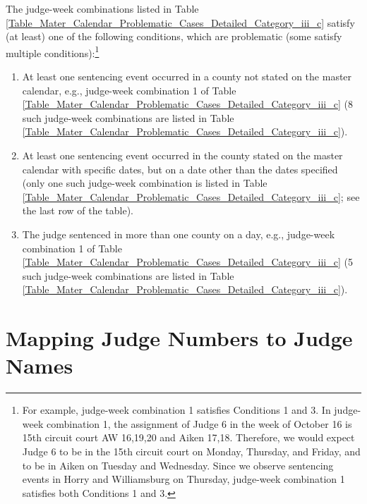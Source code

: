 \documentclass[11pt, oneside]{article}   	%
\theoremstyle{ModifiedStyle}
\begin{document}
			The judge-week combinations listed in Table \ref{Table_Mater_Calendar_Problematic_Cases_Detailed_Category_iii_c} satisfy (at least) one of the following conditions, which are problematic (some satisfy multiple conditions):\footnote{For example, judge-week combination 1 satisfies Conditions 1 and 3. In judge-week combination 1, the assignment of Judge 6 in the week of October 16 is 15th circuit court AW 16,19,20 and Aiken 17,18. Therefore, we would expect Judge 6 to be in the 15th circuit court on Monday, Thursday, and Friday, and to be in Aiken on Tuesday and Wednesday. Since we observe sentencing events in Horry and Williamsburg on Thursday, judge-week combination 1 satisfies both Conditions 1 and 3.}
			\begin{enumerate}
				\vspace{-3mm}
				\item At least one sentencing event occurred in a county not stated on the master calendar, e.g., judge-week combination 1 of Table \ref{Table_Mater_Calendar_Problematic_Cases_Detailed_Category_iii_c} (8 such judge-week combinations are listed in Table \ref{Table_Mater_Calendar_Problematic_Cases_Detailed_Category_iii_c}).
				\vspace{-2mm}
				\item At least one sentencing event occurred in the county stated on the master calendar with specific dates, but on a date other than the dates specified (only one such judge-week combination is listed in Table \ref{Table_Mater_Calendar_Problematic_Cases_Detailed_Category_iii_c}; see the last row of the table).
				\vspace{-2mm}
				\item The judge sentenced in more than one county on a day, e.g., judge-week combination 1 of Table \ref{Table_Mater_Calendar_Problematic_Cases_Detailed_Category_iii_c} (5 such judge-week combinations are listed in Table \ref{Table_Mater_Calendar_Problematic_Cases_Detailed_Category_iii_c}).
			\end{enumerate}
			\vspace{-3mm}

\section{Mapping Judge Numbers to Judge Names}
	\label{Sec:Mapping_Judge_Numbers_To_Judge_Names}
\end{document}
